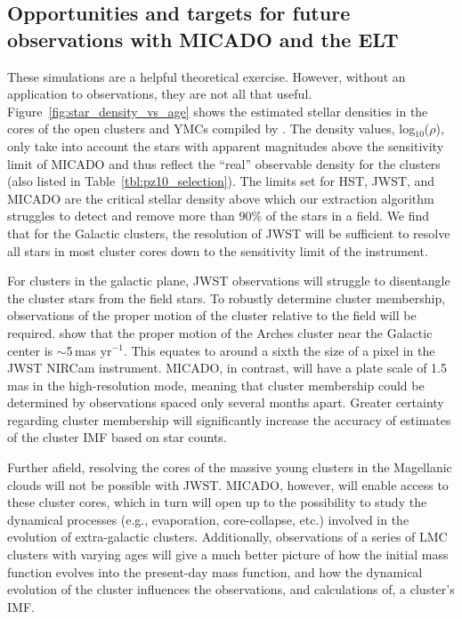 \documentclass[referee]{aa}
\newcommand{\s}{$\sim$}
\newcommand{\h}[1]{$^{#1}$}
\begin{document}
\subsection{Opportunities and targets for future observations with MICADO and the ELT}
  \label{subsec:future_opportunities}

These simulations are a helpful theoretical exercise.
However, without an application to observations, they are not all that useful.
Figure~\ref{fig:star_density_vs_age} shows the estimated stellar densities in the cores of the open clusters and YMCs compiled by \citet{portegies2010}.
The density values, log$_{10}$($\rho$), only take into account the stars with apparent magnitudes above the sensitivity limit of MICADO and thus reflect the ``real'' observable density for the clusters (also listed in Table~\ref{tbl:pz10_selection}).
The limits set for HST, JWST, and MICADO are the critical stellar density above which our extraction algorithm struggles to detect and remove more than 90\% of the stars in a field.
We find that for the Galactic clusters, the resolution of JWST will be sufficient to resolve all stars in most cluster cores down to the sensitivity limit of the instrument.

For clusters in the galactic plane, JWST observations will struggle to disentangle the cluster stars from the field stars.
To robustly determine cluster membership, observations of the proper motion of the cluster relative to the field will be required.
\citet{stolte2008} show that the proper motion of the Arches cluster near the Galactic center is \s5\,mas yr\h{-1}.
This equates to around a sixth the size of a pixel in the JWST NIRCam instrument.
MICADO, in contrast, will have a plate scale of 1.5\,mas in the high-resolution mode, meaning that cluster membership could be determined by observations spaced only several months apart.
Greater certainty regarding cluster membership will significantly increase the accuracy of estimates of the cluster IMF based on star counts.

Further afield, resolving the cores of the massive young clusters in the Magellanic clouds will not be possible with JWST. MICADO, however, will enable access to these cluster cores, which in turn will open up to the possibility to study the dynamical processes (e.g., evaporation, core-collapse, etc.) involved in the evolution of extra-galactic clusters.
Additionally, observations of a series of LMC clusters with varying ages will give a much better picture of how the initial mass function evolves into the present-day mass function, and how the dynamical evolution of the cluster influences the observations, and calculations of, a cluster's IMF\@.
\end{document}
